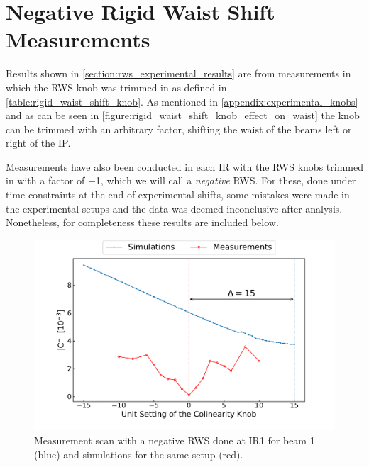 \chapter{Negative Rigid Waist Shift Measurements}
\label{appendix:inconclusive_measurements}

Results shown in \cref{section:rws_experimental_results} are from measurements in which the \acrshort{RWS} knob was trimmed in as defined in \cref{table:rigid_waist_shift_knob}.
As mentioned in \cref{appendix:experimental_knobs} and as can be seen in \cref{figure:rigid_waist_shift_knob_effect_on_waist} the knob can be trimmed with an arbitrary factor, shifting the waist of the beams left or right of the \acrshort{IP}. 

Measurements have also been conducted in each \acrshort{IR} with  the \acrshort{RWS} knobs trimmed in with a factor of \num{-1}, which we will call a \textit{negative} \acrshort{RWS}.
For these, done under time constraints at the end of experimental shifts, some mistakes were made in the experimental setups and the data was deemed inconclusive after analysis.
Nonetheless, for completeness these results are included below.

\begin{figure}[!htb]
    \centering
    \includegraphics*[width=\textwidth]{Figures/Appendices/rws_measurement_ir1_b1_neg.pdf}
    \caption{Measurement scan with a negative RWS done at IR\num{1} for beam \num{1} (\textcolor{mplblue}{blue}) and simulations for the same setup (\textcolor{mplr}{red}). }
    \label{figure:ir1_b1_neg_measurement}
\end{figure}

